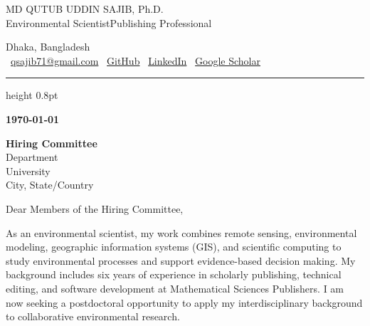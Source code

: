 \documentclass[11pt]{article}
\def\myaddresspublic{Dhaka, Bangladesh}
\newcommand{\contactsep}{\enspace\textperiodcentered\enspace}
\begin{document}

\noindent
\begin{center}
  {\LARGE MD QUTUB UDDIN SAJIB, Ph.D.}\\
  {\footnotesize \color{highlight}Environmental Scientist\contactsep Publishing Professional}

{\scriptsize
{\color{url}\myaddresspublic}%
  \\
  {\color{url}%
    \ 
    \href{mailto:qsajib71@gmail.com}{qsajib71@gmail.com}%
    \contactsep
    \ 
  \href{https://github.com/qsajib}{GitHub}%
  \contactsep
  \faLinkedin\
  \href{https://www.linkedin.com/in/md-qutub-uddin-sajib}{LinkedIn}%
  \contactsep
  \aiGoogleScholarSquare\ 
  \href{https://scholar.google.com/citations?user=8kXG-uAAAAAJ}{Google Scholar}%
  }}
\end{center}%

\vspace{0.55em}

{\color{highlight}\hrule height 0.8pt}

\vspace{1.0em}


\normalsize
\begin{flushright}
\bfseries \today
\end{flushright}

\vspace{0.25em}

{\bfseries Hiring Committee}\\[0.5em]
Department\\
University\\
City, State/Country

\vspace{1.25em}

Dear Members of the Hiring Committee,


As an environmental scientist, my work combines remote sensing,
environmental modeling, geographic information systems (GIS), and
scientific computing to study environmental processes and support
evidence-based decision making.
My background includes six years of experience
in scholarly publishing, technical editing, and software development
at Mathematical Sciences Publishers. I am now seeking a postdoctoral
opportunity to apply my interdisciplinary background to collaborative
environmental research.
\end{document}
